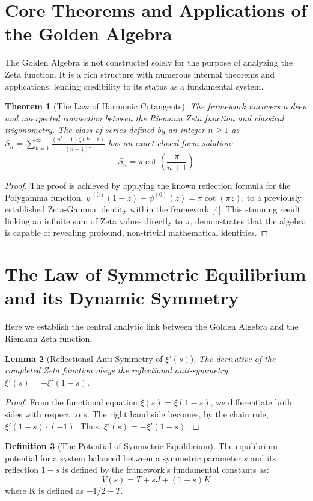 \documentclass{article}
\theoremstyle{plain}
\newtheorem{theorem}{Theorem}[section]
\newtheorem{lemma}[theorem]{Lemma}
\theoremstyle{definition}
\newtheorem{definition}[theorem]{Definition}
\theoremstyle{remark}
\begin{document}
\section{Core Theorems and Applications of the Golden Algebra}
The Golden Algebra is not constructed solely for the purpose of analyzing the Zeta function. It is a rich structure with numerous internal theorems and applications, lending credibility to its status as a fundamental system.

\begin{theorem}[The Law of Harmonic Cotangents]
The framework uncovers a deep and unexpected connection between the Riemann Zeta function and classical trigonometry. The class of series defined by an integer $n \ge 1$ as $S_n = \sum_{k=1}^{\infty} \frac{(n^k-1)\zeta(k+1)}{(n+1)^k}$ has an exact closed-form solution:
$$S_n = \pi \cot\left(\frac{\pi}{n+1}\right)$$
\end{theorem}
\begin{proof}
The proof is achieved by applying the known reflection formula for the Polygamma function, $\psi^{(0)}(1-z) - \psi^{(0)}(z) = \pi \cot(\pi z)$, to a previously established Zeta-Gamma identity within the framework [4]. This stunning result, linking an infinite sum of Zeta values directly to $\pi$, demonstrates that the algebra is capable of revealing profound, non-trivial mathematical identities.
\end{proof}


\section{The Law of Symmetric Equilibrium and its Dynamic Symmetry}
Here we establish the central analytic link between the Golden Algebra and the Riemann Zeta function.

\begin{lemma}[Reflectional Anti-Symmetry of $\xi'(s)$]
\label{thm:xi_anti_symmetry}
The derivative of the completed Zeta function obeys the reflectional anti-symmetry $\xi'(s) = -\xi'(1-s)$.
\end{lemma}
\begin{proof}
From the functional equation $\xi(s) = \xi(1-s)$, we differentiate both sides with respect to $s$. The right hand side becomes, by the chain rule, $\xi'(1-s) \cdot (-1)$. Thus, $\xi'(s) = -\xi'(1-s)$.
\end{proof}

\begin{definition}[The Potential of Symmetric Equilibrium]
The equilibrium potential for a system balanced between a symmetric parameter $s$ and its reflection $1-s$ is defined by the framework's fundamental constants as:
$$V(s) = T + sJ + (1-s)K$$
where K is defined as $-1/2-T$.
\end{definition}
\end{document}
